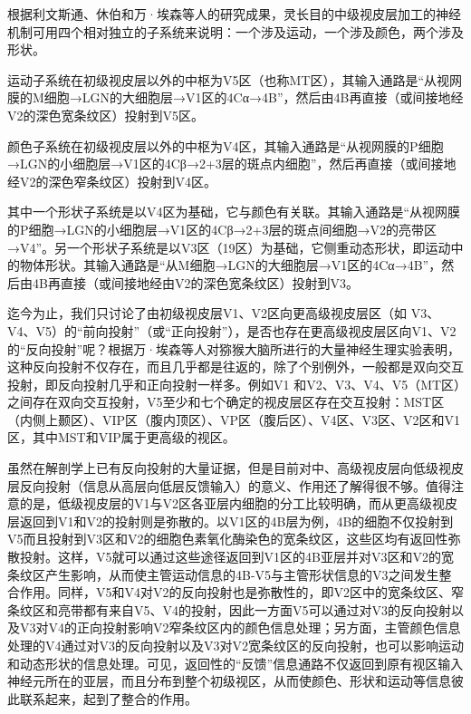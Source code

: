 \documentclass[a4paper,10pt]{article}\large
\begin{document}
根据利文斯通、休伯和万·埃森等人\cite{14:misc}的研究成果，灵长目的中级视皮层加工的神经机制可用四个相对独立的子系统来说明：一个涉及运动，一个涉及颜色，两个涉及形状。
        


运动子系统在初级视皮层以外的中枢为V5区（也称MT区），其输入通路是“从视网膜的M细胞→LGN的大细胞层→V1区的4Cα→4B”，然后由4B再直接（或间接地经V2的深色宽条纹区）投射到V5区。
        


颜色子系统在初级视皮层以外的中枢为V4区，其输入通路是“从视网膜的P细胞→LGN的小细胞层→V1区的4Cβ→2+3层的斑点内细胞”，然后再直接（或间接地经V2的深色窄条纹区）投射到V4区。
        


其中一个形状子系统是以V4区为基础，它与颜色有关联。其输入通路是“从视网膜的P细胞→LGN的小细胞层→V1区的4Cβ→2+3层的斑点间细胞→V2的亮带区→V4”。另一个形状子系统是以V3区（19区）为基础，它侧重动态形状，即运动中的物体形状。其输入通路是“从M细胞→LGN的大细胞层→V1区的4Cα→4B”，然后由4B再直接（或间接地经由V2的深色宽条纹区）投射到V3。
        


迄今为止，我们只讨论了由初级视皮层V1、V2区向更高级视皮层区（如 V3、V4、V5）的“前向投射”（或“正向投射”），是否也存在更高级视皮层区向V1、V2的“反向投射”呢？根据万·埃森等人对猕猴大脑所进行的大量神经生理实验表明，这种反向投射不仅存在，而且几乎都是往返的，除了个别例外，一般都是双向交互投射，即反向投射几乎和正向投射一样多。例如V1 和V2、V3、V4、V5（MT区）之间存在双向交互投射，V5至少和七个确定的视皮层区存在交互投射：MST区（内侧上颞区）、VIP区（腹内顶区）、VP区（腹后区）、V4区、V3区、V2区和V1区，其中MST和VIP属于更高级的视区。
         


虽然在解剖学上已有反向投射的大量证据，但是目前对中、高级视皮层向低级视皮层反向投射（信息从高层向低层反馈输入）的意义、作用还了解得很不够\cite{14:misc}。值得注意的是，低级视皮层的V1与V2区各亚层内细胞的分工比较明确，而从更高级视皮层返回到V1和V2的投射则是弥散的。以V1区的4B层为例，4B的细胞不仅投射到V5而且投射到V3区和V2的细胞色素氧化酶染色的宽条纹区，这些区均有返回性弥散投射。这样，V5就可以通过这些途径返回到V1区的4B亚层并对V3区和V2的宽条纹区产生影响，从而使主管运动信息的4B-V5与主管形状信息的V3之间发生整合作用。同样，V5和V4对V2的反向投射也是弥散性的，即V2区中的宽条纹区、窄条纹区和亮带都有来自V5、V4的投射，因此一方面V5可以通过对V3的反向投射以及V3对V4的正向投射影响V2窄条纹区内的颜色信息处理；另方面，主管颜色信息处理的V4通过对V3的反向投射以及V3对V2宽条纹区的反向投射，也可以影响运动和动态形状的信息处理。可见，返回性的“反馈”信息通路不仅返回到原有视区输入神经元所在的亚层，而且分布到整个初级视区，从而使颜色、形状和运动等信息彼此联系起来，起到了整合的作用。
\end{document}
